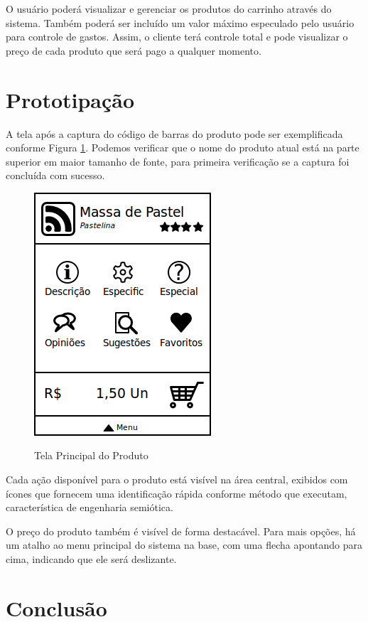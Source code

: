 \documentclass{article}
\begin{document}
O usuário poderá visualizar e gerenciar os produtos do carrinho através do
sistema. Também poderá ser incluído um valor máximo especulado pelo usuário para
controle de gastos. Assim, o cliente terá controle total e pode visualizar o
preço de cada produto que será pago a qualquer momento.

\section{Prototipação}
\label{sec:prototipacao}

A tela após a captura do código de barras do produto pode ser exemplificada
conforme Figura \ref{fig:produto}. Podemos verificar que o nome do produto atual
está na parte superior em maior tamanho de fonte, para primeira verificação se a
captura foi concluída com sucesso.

\begin{figure}[ht]
    \centering{}
    \includegraphics[scale=0.4]{images/produto.png}
    \label{fig:produto}
    \caption{Tela Principal do Produto}
\end{figure}

Cada ação disponível para o produto está visível na área central, exibidos com
ícones que fornecem uma identificação rápida conforme método que executam,
característica de engenharia semiótica.

O preço do produto também é visível de forma destacável. Para mais opções, há um
atalho ao menu principal do sistema na base, com uma flecha apontando para cima,
indicando que ele será deslizante.

\section{Conclusão}
\label{sec:conclusao}



\end{document}
